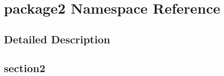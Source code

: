 \hypertarget{namespacepackage2}{\section{package2 Namespace Reference}
\label{namespacepackage2}
}


\subsection{Detailed Description}
\hypertarget{/root/SSDPI/frontend/class.MenuGrabber.php_section2}{}\subsection{section2}\label{/root/SSDPI/frontend/class.MenuGrabber.php_section2}
